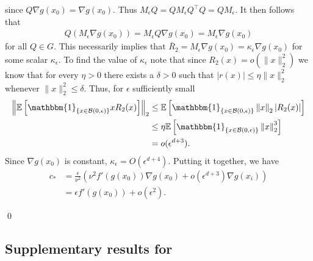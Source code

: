 \documentclass[11pt]{article}
\begin{document}
since $Q\nabla g(x_0) = \nabla g(x_0)$. Thus $M_{\epsilon}Q = QM_{\epsilon}Q^{\top}Q = QM_{\epsilon}$. It then follows that
\begin{align*}
    Q(M_{\epsilon}\nabla g(x_0)) = M_{\epsilon}Q\nabla g(x_0) = M_{\epsilon}\nabla g(x_0)
\end{align*}
for all $Q \in G$. This necessarily implies that $\bar{R}_2 = M_{\epsilon}\nabla g(x_0) = \kappa_{\epsilon}\nabla g(x_0)$ for some scalar $\kappa_{\epsilon}$. To find the value of $\kappa_{\epsilon}$ note that since $R_2(x) = o(\|x\|_2^2)$
we know that for every $\eta > 0$ there exists a $\delta > 0$ such that $|r(x)| \leq \eta \|x\|^2_2$ whenever $\|x\|_2^2 \leq \delta$. Thus, for $\epsilon$ sufficiently small
\begin{align*}
    \left\|\mathbb{E}\left[\mathbbm{1}_{\{x \in \mathcal{B}(0, \epsilon)\}}xR_2(x)\right]\right\|_2 & \leq \mathbb{E}\left[\mathbbm{1}_{\{x \in \mathcal{B}(0, \epsilon)\}}\left\|x\right\|_2|R_2(x)|\right]\\
    &\leq \eta \mathbb{E}\left[\mathbbm{1}_{\{x \in \mathcal{B}(0, \epsilon)\}}\left\|x\right\|_2^3\right] \\
    &= o(\epsilon^{d+3}).
\end{align*}
Since $\nabla g(x_0)$ is constant, $\kappa_{\epsilon} = O(\epsilon^{d+4})$. Putting it together, we have
\begin{align*}
    c_* &= \frac{\epsilon}{\nu^2}\left(\nu^2f'( g(x_0))\nabla g(x_0) + o(\epsilon^{d+3})\nabla g(x_i)\right) \\
    &= \epsilon f'( g(x_0))+ o(\epsilon^2).
\end{align*}

\qed{}

\subsection{Supplementary results for }
\end{document}
